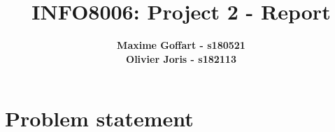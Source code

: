 \documentclass{article}
\begin{document}

\title{\Large{INFO8006: Project 2 - Report}}
\vspace{1cm}
\author{\small{\bf Maxime Goffart - s180521} \\ \small{\bf Olivier Joris - s182113}}

\maketitle


\section{Problem statement}
\end{document}
